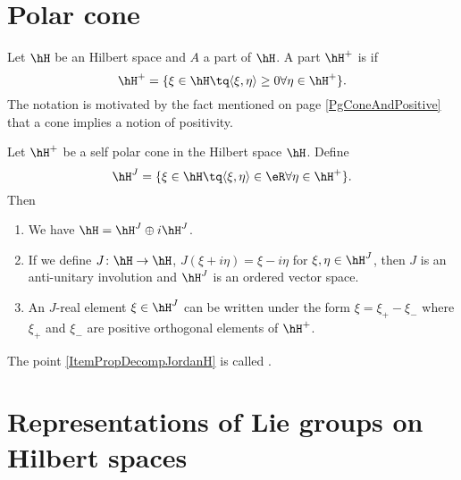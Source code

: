 \section{Polar cone}

Let $\hH$ be an Hilbert space and $A$ a part of $\hH$. A part $\hH^+$ is  if
\begin{equation}
	\hH^+=\{ \xi\in\hH\tq\langle \xi, \eta\rangle \geq 0\forall \eta\in \hH^+ \}.
\end{equation}
The notation is motivated by the fact mentioned on page \ref{PgConeAndPositive} that a cone implies a notion of positivity.

\begin{proposition}
	Let $\hH^+$ be a self polar cone in the Hilbert space $\hH$. Define 
	\begin{equation}
		\hH^J=\{ \xi\in\hH\tq\langle \xi, \eta\rangle \in\eR\forall\eta\in\hH^+ \}.
	\end{equation}
	Then
	\begin{enumerate}
		\item
			We have $\hH=\hH^J\oplus i\hH^J$.
		\item
			If we define $J\colon \hH\to \hH$, $J(\xi+i\eta)=\xi-i\eta$ for $\xi,\eta\in\hH^J$, then $J$ is an anti-unitary involution and $\hH^J$ is an ordered vector space.
		\item\label{ItemPropDecompJordanH}
			An $J$-real element $\xi\in\hH^J$ can be written under the form $\xi=\xi_+-\xi_-$ where $\xi_+$ and $\xi_-$ are positive orthogonal elements of $\hH^+$.
	\end{enumerate}
\end{proposition}
The point \ref{ItemPropDecompJordanH} is called .


\section{Representations of Lie groups on Hilbert spaces}

